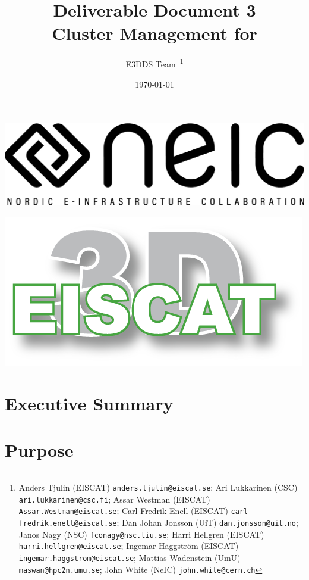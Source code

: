 \documentclass[12pt,a4paper]{article}
\title{
{\bf Deliverable Document 3} \\
Cluster Management for \ED}
\author{E3DDS Team~\footnote{
Anders Tjulin (EISCAT) {\tt anders.tjulin@eiscat.se};
Ari Lukkarinen (CSC) {\tt ari.lukkarinen@csc.fi};
Assar Westman (EISCAT) {\tt Assar.Westman@eiscat.se};
Carl-Fredrik Enell (EISCAT) {\tt carl-fredrik.enell@eiscat.se};
Dan Johan Jonsson (UiT) {\tt dan.jonsson@uit.no};
Janos Nagy (NSC) {\tt fconagy@nsc.liu.se};
Harri Hellgren (EISCAT) {\tt harri.hellgren@eiscat.se};
Ingemar H\"{a}ggstr\"{o}m (EISCAT) {\tt ingemar.haggstrom@eiscat.se};
Mattias Wadenstein (UmU) {\tt maswan@hpc2n.umu.se};
John White (NeIC) {\tt john.white@cern.ch}}}
\date{\today}
\begin{document}
\pagestyle{fancy}

\maketitle
\par\noindent
\begin{minipage}{0.5\textwidth}
  \includegraphics[scale=0.18]{NEIC_logo_screen_black.pdf}
\end{minipage}
\begin{minipage}{0.5\textwidth}
  \hfill
  \includegraphics[width=0.75\linewidth]{e3d-logo-green-500px}
\end{minipage}

\newpage
\tableofcontents
\newpage

\section{Executive Summary}
\label{exec-summ}




\section{Purpose}
\label{purpose}
\end{document}
